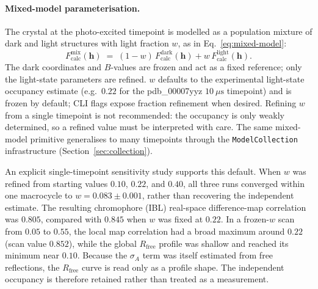 \documentclass{iucrjournals}
\begin{document}
\paragraph{Mixed-model parameterisation.}
The crystal at the photo-excited timepoint is modelled as a population
mixture of dark and light structures with light fraction $w$, as in
Eq.~\ref{eq:mixed-model}:
%
\begin{equation}
  F_\mathrm{calc}^\mathrm{mix}(\mathbf{h}) \;=\; (1 - w)\,
  F_\mathrm{calc}^\mathrm{dark}(\mathbf{h}) + w\,
  F_\mathrm{calc}^\mathrm{light}(\mathbf{h}).
  \label{eq:mixed-model}
\end{equation}
%
The dark coordinates and $B$-values are frozen and act as a fixed reference;
only the light-state parameters are refined.  $w$ defaults to the
experimental light-state occupancy estimate (e.g.\ $0.22$ for the pdb\_00007yyz
$10~\mu\text{s}$ timepoint) and is frozen by default; CLI flags expose
fraction refinement when desired. Refining $w$ from a single timepoint is not
recommended: the occupancy is only weakly determined, so a refined value must be
interpreted with care. The same mixed-model primitive
generalises to many timepoints through the \texttt{ModelCollection}
infrastructure (Section~\ref{sec:collection}).

An explicit single-timepoint sensitivity study supports this default. When $w$
was refined from starting values $0.10$, $0.22$, and $0.40$, all three runs
converged within one macrocycle to $w=0.083\pm0.001$, rather than recovering the
independent estimate. The resulting chromophore (IBL) real-space difference-map
correlation was $0.805$, compared with $0.845$ when $w$ was fixed at $0.22$. In
a frozen-$w$ scan from $0.05$ to $0.55$, the local map correlation had a broad
maximum around $0.22$ (scan value $0.852$), while the global $R_\mathrm{free}$
profile was shallow and reached its minimum near $0.10$. Because the
$\sigma_A$ term was itself estimated from free reflections, the $R_\mathrm{free}$
curve is read only as a profile shape. The independent occupancy is therefore
retained rather than treated as a measurement.
\end{document}
